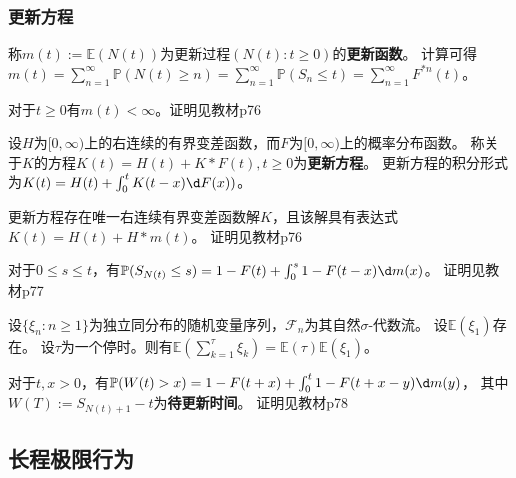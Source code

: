 \documentclass[main]{subfiles}
\begin{document}
\subsubsection{更新方程}
\begin{definition}\label{def:renew_function}
  称\(m(t):=\mathbb{E}(N(t))\)为更新过程\((N(t):t \geq 0)\)的\textbf{更新函数}。
  计算可得\(m(t)=\sum_{n=1}^{\infty} \mathbb{P}(N(t)\geq n)=\sum_{n=1}^{\infty} \mathbb{P}(S_n \leq t)=\sum_{n=1}^{\infty} F^{*n}(t)\)。
\end{definition}
\begin{theorem}\label{the:mtleifn}
  对于\(t \geq 0\)有\(m(t)<\infty\)。证明见教材p76
\end{theorem}
\begin{definition}\label{def:renew_equation}
  设\(H\)为\([0,\infty)\)上的右连续的有界变差函数，而\(F\)为\([0,\infty)\)上的概率分布函数。
  称关于\(K\)的方程\(K(t)=H(t)+K * F(t),t \geq 0\)为\textbf{更新方程}。
  更新方程的积分形式为\(K(t)=H(t)+\int_{0}^{t}K(t-x) \d F(x))\)。
\end{definition}
\begin{theorem}\label{the:renew_equation_solve}
  更新方程存在唯一右连续有界变差函数解\(K\)，且该解具有表达式\(K(t)=H(t)+H * m(t)\)。
  证明见教材p76
\end{theorem}
\begin{theorem}\label{the:psntleqs}
  对于\(0 \leq s \leq t\)，有\(\mathbb{P}(S_{N(t)}\leq s)=1-F(t)+\int_{0}^{s} 1-F(t-x) \d m(x)\)。
  证明见教材p77
\end{theorem}
\begin{theorem}[瓦尔德恒等式]\label{the:waerdf_equarion}
  设\(\{\xi_n:n \geq 1\}\)为独立同分布的随机变量序列，\(\mathcal{F}_n\)为其自然\(\sigma\)-代数流。
  设\(\mathbb{E}(\xi_1)\)存在。
  设\(\tau\)为一个停时。则有\(\mathbb{E}(\sum_{k=1}^{\tau} \xi_k)=\mathbb{E}(\tau)\mathbb{E}(\xi_1)\)。
\end{theorem}
\begin{theorem}\label{the:3.1.8}
  对于\(t,x>0\)，有\(\mathbb{P}(W(t)>x)=1-F(t+x)+\int_{0}^t 1-F(t+x-y) \d m(y)\)，
  其中\(W(T):=S_{N(t)+1}-t\)为\textbf{待更新时间}。
  证明见教材p78
\end{theorem}
\subsection{长程极限行为}
\end{document}
